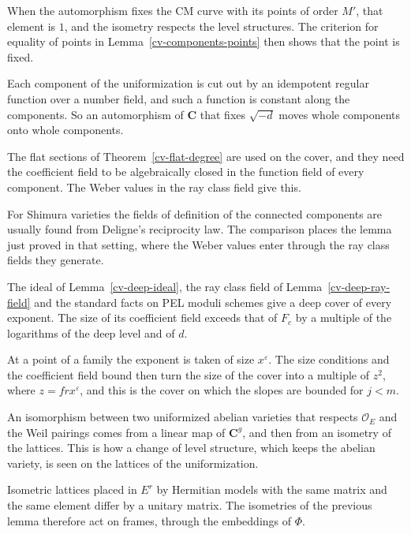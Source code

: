 When the automorphism fixes the CM curve with its points of order $M'$, that element is $1$, and the
isometry respects the level structures. The criterion for equality of points in
Lemma~\ref{cv-components-points} then shows that the point is fixed.

Each component of the uniformization is cut out by an idempotent regular function over a number field,
and such a function is constant along the components. So an automorphism of $\mathbf C$ that fixes
$\sqrt{-d}$ moves whole components onto whole components.

The flat sections of Theorem~\ref{cv-flat-degree} are used on the cover, and they need the
coefficient field to be algebraically closed in the function field of every component. The Weber
values in the ray class field give this.

For Shimura varieties the fields of definition of the connected components are usually found from
Deligne's reciprocity law. The comparison places the lemma just proved in that setting, where the
Weber values enter through the ray class fields they generate.

The ideal of Lemma~\ref{cv-deep-ideal}, the ray class field of Lemma~\ref{cv-deep-ray-field} and the
standard facts on PEL moduli schemes give a deep cover of every exponent. The size of its
coefficient field exceeds that of $F_c$ by a multiple of the logarithms of the deep level and of $d$.

At a point of a family the exponent is taken of size $x^\varepsilon$. The size conditions and the
coefficient field bound then turn the size of the cover into a multiple of $z^2$, where
$z=frx^\varepsilon$, and this is the cover on which the slopes are bounded for $j<m$.

An isomorphism between two uniformized abelian varieties that respects $\mathcal O_E$ and the Weil
pairings comes from a linear map of $\mathbf C^g$, and then from an isometry of the lattices. This is how
a change of level structure, which keeps the abelian variety, is seen on the lattices of the
uniformization.

Isometric lattices placed in $E^r$ by Hermitian models with the same matrix and the same element differ
by a unitary matrix. The isometries of the previous lemma therefore act on frames, through the embeddings
of $\Phi$.

